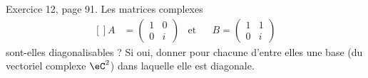 \begin{exercice}\label{exoLineraire0036}

	Exercice 12, page 91. Les matrices complexes
	\begin{equation}
		\begin{aligned}[]
			A&=\begin{pmatrix}
				1	&	0	\\ 
				0	&	i	
			\end{pmatrix}
			&\text{et}&&B=\begin{pmatrix}
				1	&	1	\\ 
				0	&	i	
			\end{pmatrix}
		\end{aligned}
	\end{equation}
	sont-elles diagonalisables ? Si oui, donner pour chacune d'entre elles une base (du vectoriel complexe $\eC^2$) dans laquelle elle est diagonale.

\end{exercice}
